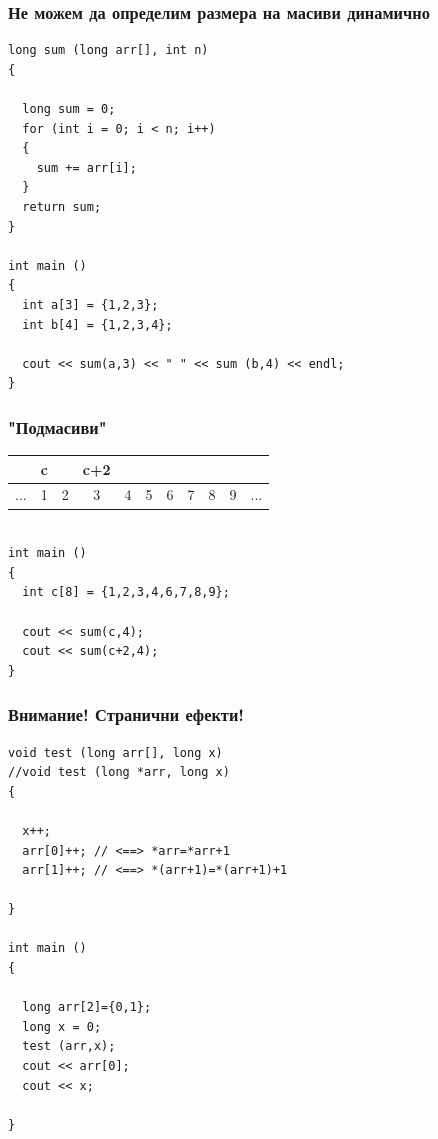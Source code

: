 \documentclass{beamer}
\begin{document}
\begin{frame}[fragile]
\frametitle{Не можем да определим размера на масиви динамично}

\begin{flushleft}
\begin{lstlisting}
long sum (long arr[], int n)
{
  
  long sum = 0;
  for (int i = 0; i < n; i++)
  {
    sum += arr[i];
  }
  return sum;
}

int main ()
{
  int a[3] = {1,2,3};
  int b[4] = {1,2,3,4};

  cout << sum(a,3) << " " << sum (b,4) << endl;
}

\end{lstlisting}
\end{flushleft}

\end{frame}


\begin{frame}[fragile]
\frametitle{"Подмасиви"}

\begin{tabular} {c|c|c|c|c|c|c|c|c|c|c }

    &  c   &    & c+2 \\\hline
... &1     & 2  & \alert{3}  & \alert{4} & \alert{5} &  \alert{6} & 7 & 8 & 9 &...  \\\hline
  
\end{tabular}

\begin{flushleft}
\begin{lstlisting}

int main ()
{
  int c[8] = {1,2,3,4,6,7,8,9};

  cout << sum(c,4);
  cout << sum(c+2,4);
}

\end{lstlisting}
\end{flushleft}

\end{frame}


\begin{frame}[fragile]
\frametitle{Внимание! Странични ефекти! }

\begin{flushleft}
\begin{lstlisting}
void test (long arr[], long x)
//void test (long *arr, long x)
{
  
  x++;       
  arr[0]++; // <==> *arr=*arr+1
  arr[1]++; // <==> *(arr+1)=*(arr+1)+1

}

int main ()
{
 
  long arr[2]={0,1};
  long x = 0;
  test (arr,x);
  cout << arr[0];
  cout << x;

}

\end{lstlisting}
\end{flushleft}

\end{frame}
\end{document}
